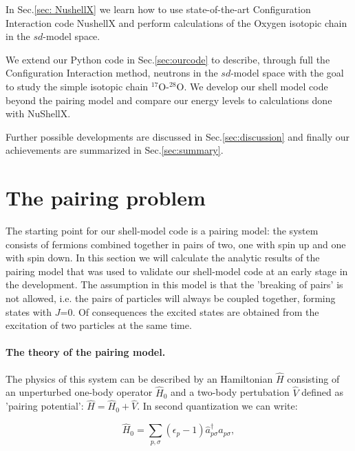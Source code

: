\documentclass[twoside]{article}
\begin{document}
In Sec.\ref{sec: NushellX} we learn how to use state-of-the-art Configuration Interaction code NushellX and perform calculations of the Oxygen isotopic chain in the $sd$-model space.

We extend our Python code in Sec.\ref{sec:ourcode} to describe, through full the Configuration Interaction method, neutrons in the $sd$-model space with the goal to study the simple isotopic chain $^{17}$O-$^{28}$O. We develop our shell model code beyond the pairing model and compare our energy levels to calculations done with NuShellX.

Further possible developments are discussed in Sec.\ref{sec:discussion} and finally our achievements are summarized in Sec.\ref{sec:summary}.
 
\newpage

\section{The pairing problem}
\label{sec:pair} 

The starting point for our shell-model code is a pairing model: the system consists of fermions combined together in pairs of two, one with spin up and one with spin down. In this section we will calculate the analytic results of the pairing model that was used to validate our shell-model code at an early stage in the development. The assumption in this model is that the 'breaking of pairs' is not allowed, i.e. the pairs of particles will always be coupled together, forming states with $J$=0. Of consequences the excited states are obtained from the excitation of two particles at the same time. 


\paragraph{The theory of the pairing model.} The physics of this system can be described by an Hamiltonian $\hat H$ consisting of an unperturbed one-body operator $\hat H_0$ and a two-body pertubation $\hat V $ defined as 'pairing potential': $\hat H = \hat H_0 + \hat V$. In second quantization we can write:

\begin{equation}
\hat H_0 =  \sum_{p,\sigma} (\epsilon_p-1) \hat a_{p\sigma}^\dagger \hat a_{p\sigma},
\label{eq:H_0}
\end{equation}
\end{document}
